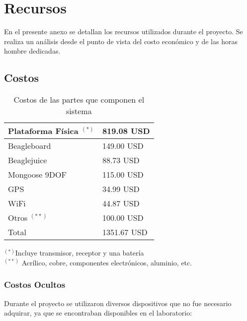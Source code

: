 \documentclass[main]{subfiles}
\begin{document}
\chapter{Recursos}
\label{chap:anexo_costos}
En el presente anexo se detallan los recursos utilizados durante el proyecto. Se realiza un an\'alisis desde el punto de vista del costo econ\'omico y de las horas hombre dedicadas.

\section{Costos}

\begin{table}[H]
\begin{center}
\begin{tabular}{|p{5cm}|p{3cm}|}
\hline
Plataforma F\'isica $^{(*)}$  & 819.08 USD  \\
\hline
Beagleboard & 149.00 USD \\
\hline
Beaglejuice & 88.73 USD\\
\hline 
Mongoose 9DOF & 115.00 USD\\
\hline
GPS & 34.99 USD\\
\hline
WiFi & 44.87 USD\\
\hline
Otros $^{(**)}$ & 100.00 USD\\
\hline
Total & 1351.67 USD \\
\hline
\end{tabular}
\label{tab:acc-anexo}
\end{center}
\begin{center}
$^{(*)}$Incluye transmisor, receptor y una bater\'ia\\
$^{(**)}$ Acr\'ilico, cobre, componentes electr\'onicos, aluminio, etc.
\end{center}
\caption{Costos de las partes que componen el sistema}
\end{table}

\subsection{Costos Ocultos}
\label{sec:anexo_costos-costos-ocultos}

Durante el proyecto se utilizaron diversos dispositivos que no fue necesario adquirar, ya que se encontraban disponibles en el laboratorio:
\end{document}
